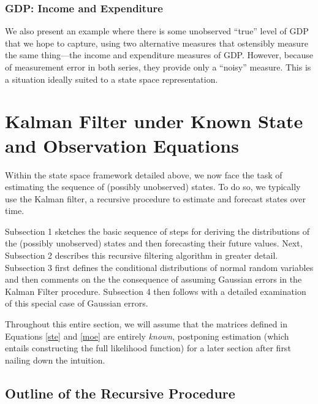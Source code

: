 \documentclass[a4paper,12pt]{article}
\begin{document}
\subsubsection{GDP: Income and Expenditure}
We also present an example where there is some unobserved ``true'' level
of GDP that we hope to capture, using two alternative measures that
ostensibly measure the same thing---the income and expenditure measures
of GDP. However, because of measurement error in both series, they
provide only a ``noisy'' measure. This is a situation ideally suited to
a state space representation.


\newpage
\section{Kalman Filter under Known State and Observation Equations}

Within the state space framework detailed above, we now face the task of estimating the sequence of (possibly unobserved) states. To do so, we typically use the Kalman filter, a recursive procedure to estimate and forecast states over time. 

Subsection 1 sketches the basic sequence of steps for deriving the distributions of the (possibly unobserved) states and then forecasting their future values. Next, Subsection 2 describes this recursive filtering algorithm in greater detail. Subsection 3 first defines the conditional distributions of normal random variables and then comments on the the consequence of assuming Gaussian errors in the Kalman Filter procedure. Subsection 4 then follows with a detailed examination of this special case of Gaussian errors.

Throughout this entire section, we will assume that the matrices defined in Equations \ref{ste} and \ref{moe} are entirely \emph{known}, postponing estimation (which entails constructing the full likelihood function) for a later section after first nailing down the intuition. 

\subsection{Outline of the Recursive Procedure}
\end{document}
